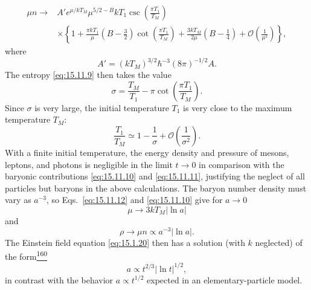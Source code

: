 \begin{equation}
  \begin{split}
  \mu n
  \longrightarrow{}&
  A'e^{\mu/kT_M}\mu^{5/2-B}kT_1
  \csc\left(\frac{\pi T_1}{T_M}\right)\\
  &\times
  \left\{
    1
    +\frac{\pi kT_1}{\mu}
      \left(B-\frac32\right)
      \cot\left(\frac{\pi T_1}{T_M}\right)
    +\frac{3kT_M}{2\mu}
      \left(B-\frac14\right)
    +\mathcal O\left(\frac1{\mu^2}\right)
  \right\},
  \end{split}
  \tag{15.11.12}\label{eq:15.11.12}
\end{equation}
where
\[
  A'=(kT_M)^{3/2}\hbar^{-3}(8\pi)^{-1/2}A.
\]
The entropy \eqref{eq:15.11.9} then takes the value
\begin{equation}
  \sigma
  =
  \frac{T_M}{T_1}
  -\pi\cot\left(\frac{\pi T_1}{T_M}\right).
  \tag{15.11.13}\label{eq:15.11.13}
\end{equation}
Since \(\sigma\) is very large, the initial temperature \(T_1\) is very
close to the maximum temperature \(T_M\):
\begin{equation}
  \frac{T_1}{T_M}
  \simeq
  1-\frac1\sigma+\mathcal O\left(\frac1{\sigma^2}\right).
  \tag{15.11.14}\label{eq:15.11.14}
\end{equation}
With a finite initial temperature, the energy density and pressure of mesons,
leptons, and photons is negligible in the limit \(t\to0\) in comparison with
the baryonic contributions \eqref{eq:15.11.10} and
\eqref{eq:15.11.11}, justifying the neglect of all particles but baryons in
the above calculations. The baryon number density must vary as \(a^{-3}\),
so Eqs.~\eqref{eq:15.11.12} and \eqref{eq:15.11.10} give for \(a\to0\)
\begin{equation}
  \mu\longrightarrow3kT_M\lvert\ln a\rvert
  \tag{15.11.15}\label{eq:15.11.15}
\end{equation}
and
\begin{equation}
  \rho\longrightarrow\mu n
  \propto a^{-3}\lvert\ln a\rvert.
  \tag{15.11.16}\label{eq:15.11.16}
\end{equation}
The Einstein field equation \eqref{eq:15.1.20} then has a solution (with
\(k\) neglected) of the
form\hyperref[ch15-ref-160]{\textsuperscript{160}}
\begin{equation}
  a\propto t^{2/3}\lvert\ln t\rvert^{1/2},
  \tag{15.11.17}\label{eq:15.11.17}
\end{equation}
in contrast with the behavior \(a\propto t^{1/2}\) expected in an
elementary-particle model.

